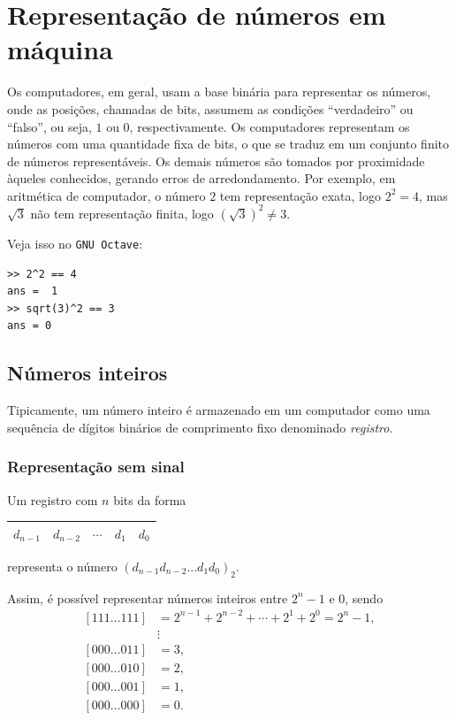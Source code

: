 \section{Representação de números em máquina}

Os computadores, em geral, usam a base binária para representar os números, onde as posições, chamadas de bits, assumem as condições ``verdadeiro'' ou ``falso'', ou seja, $1$ ou $0$, respectivamente. Os computadores representam os números com uma quantidade fixa de bits, o que se traduz em um conjunto finito de números representáveis. Os demais números são tomados por proximidade àqueles conhecidos, gerando erros de arredondamento. Por exemplo, em aritmética de computador, o número $2$ tem representação exata, logo $2^2=4$, mas $\sqrt{3}$ não tem representação finita, logo $(\sqrt{3})^2\neq 3$.

Veja isso no \verb+GNU Octave+:
\begin{verbatim}
>> 2^2 == 4
ans =  1
>> sqrt(3)^2 == 3
ans = 0
\end{verbatim}


\subsection{Números inteiros}

Tipicamente, um número inteiro é armazenado em um computador como uma sequência de dígitos binários de comprimento fixo denominado \emph{registro}.

\subsubsection{Representação sem sinal}
Um registro com $n$ bits da forma
 \begin{center}
   \begin{tabular}{|c|c|c|c|c|}\hline
     $d_{n-1}$ & $d_{n-2}$ & $\cdots$ & $d_1$ & $d_0$\\\hline
   \end{tabular}
 \end{center}
representa o número $(d_{n-1}d_{n-2}...d_1d_0)_2$.

Assim, é possível representar números inteiros entre $2^n-1$ e $0$, sendo
\begin{equation}
\begin{split}
  [111\ldots 111] & = 2^{n-1}+2^{n-2}+\cdots+2^1+2^0=2^n-1,\\
                &\vdots\\
  [000\ldots 011] &= 3, \\
  [000\ldots 010] &= 2, \\
  [000\ldots 001] &= 1, \\
  [000\ldots 000] & = 0.
\end{split}
\end{equation}

